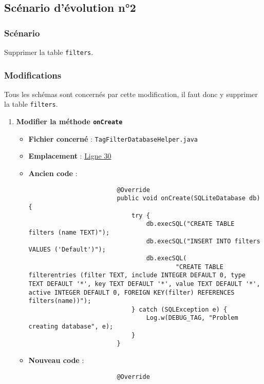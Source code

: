 \subsection{Scénario d'évolution n°2}
\subsubsection{Scénario}
Supprimer la table \texttt{filters}.
\subsubsection{Modifications}
Tous les schémas sont concernés par cette modification, il faut donc y supprimer la table \texttt{filters}.

\begin{enumerate}
    \item \textbf{Modifier la méthode \texttt{onCreate}}
          \begin{itemize}
              \item \textbf{Fichier concerné} : \texttt{TagFilterDatabaseHelper.java}
              \item \textbf{Emplacement} :
                    \href{https://github.com/MarcusWolschon/osmeditor4android/blob/master/src/main/java/de/blau/android/filter/TagFilterDatabaseHelper.java#L30}{Ligne 30}
              \item \textbf{Ancien code} :
                    \begin{verbatim}
                        @Override
                        public void onCreate(SQLiteDatabase db) {
                            try {
                                db.execSQL("CREATE TABLE filters (name TEXT)");
                                db.execSQL("INSERT INTO filters VALUES ('Default')");
                                db.execSQL(
                                        "CREATE TABLE filterentries (filter TEXT, include INTEGER DEFAULT 0, type TEXT DEFAULT '*', key TEXT DEFAULT '*', value TEXT DEFAULT '*', active INTEGER DEFAULT 0, FOREIGN KEY(filter) REFERENCES filters(name))");
                            } catch (SQLException e) {
                                Log.w(DEBUG_TAG, "Problem creating database", e);
                            }
                        }
                    \end{verbatim}
              \item \textbf{Nouveau code} :
                    \begin{verbatim}
                        @Override

\end{verbatim}
\end{itemize}
\end{enumerate}
